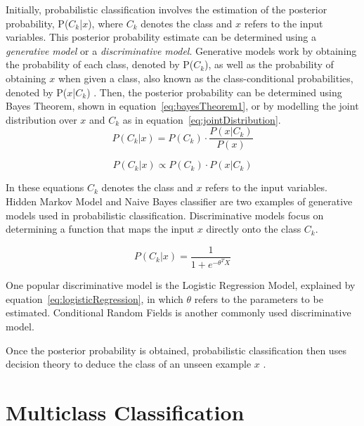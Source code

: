Initially, probabilistic classification involves the estimation of the posterior probability, P($C_k$|$x$), where $C_k$ denotes the class and $x$ refers to the input variables. This posterior probability estimate can be determined using a \textit{generative model} or a \textit{discriminative model}. Generative models work by obtaining the probability of each class, denoted by P($C_k$), as well as the probability of obtaining $x$ when given a class, also known as the class-conditional probabilities, denoted by P($x$|$C_k$) \citep{aggarwal2014}. Then, the posterior probability can be determined using Bayes Theorem, shown in equation~\ref{eq:bayesTheorem1}, or by modelling the joint distribution over $x$ and $C_k$ as in equation~\ref{eq:jointDistribution}. 
\begin{equation}
    \label{eq:bayesTheorem1}
    P(C_k|x) = P(C_k)\cdot\frac{P(x|C_k)}{P(x)}
\end{equation}

\begin{equation}
    \label{eq:jointDistribution}
    P({C_k}|x) \propto P(C_k)\cdot P(x|C_k)
\end{equation}
\pagebreak[1]

In these equations $C_k$ denotes the class and $x$ refers to the input variables. Hidden Markov Model and Naive Bayes classifier are two examples of generative models used in probabilistic classification. Discriminative models focus on determining a function that maps the input $x$ directly onto the class $C_k$. 

\begin{equation}
    \label{eq:logisticRegression}
    P(C_k|x) = \frac{1}{1+e^{-\theta^{T}X}}
\end{equation}

One popular discriminative model is the Logistic Regression Model, explained by equation~\ref{eq:logisticRegression}, in which $\theta$ refers to the parameters to be estimated. Conditional Random Fields is another commonly used discriminative model. 

Once the posterior probability is obtained, probabilistic classification then uses decision theory to deduce the class of an unseen example $x$ \citep{aggarwal2014}. 

\section{Multiclass Classification}
\label{sec:multiclass}


